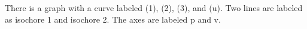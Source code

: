 There is a graph with a curve labeled (1), (2), (3), and (u). Two lines are labeled as isochore 1 and isochore 2. The axes are labeled p and v.